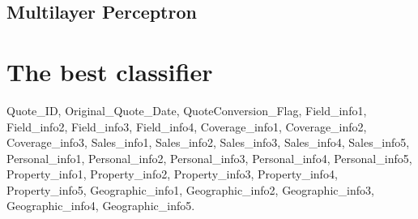 \subsection{Multilayer Perceptron}



\section{The best classifier}






 Quote\_ID, Original\_Quote\_Date, QuoteConversion\_Flag, Field\_info1, Field\_info2, Field\_info3, Field\_info4, Coverage\_info1, Coverage\_info2, Coverage\_info3, Sales\_info1, Sales\_info2, Sales\_info3, Sales\_info4, Sales\_info5, Personal\_info1, Personal\_info2, Personal\_info3, Personal\_info4, Personal\_info5, Property\_info1, Property\_info2, Property\_info3, Property\_info4, Property\_info5, Geographic\_info1, Geographic\_info2, Geographic\_info3, Geographic\_info4, Geographic\_info5.